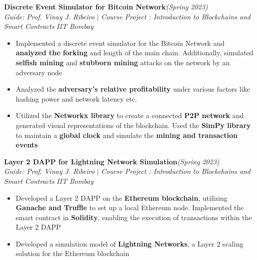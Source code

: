 \documentclass[a4paper,10pt]{article}
\begin{document}
\vspace{\baselineskip}
\vspace{-15pt}
\noindent\textbf{\large Discrete Event Simulator for Bitcoin Network}\hfill{\sl \small (Spring 2023)}\\
{\it Guide: Prof. Vinay J. Ribeiro} $|$ {\it Course Project : Introduction to Blockchains and Smart Contracts } \hfill{\it IIT Bombay}\\
\vspace{-15pt}
\begin{itemize}[itemsep = -0.65 mm, leftmargin=*]
    \item Implemented a discrete event simulator for the Bitcoin Network and \textbf{analyzed the forking} and length of the main chain. Additionally, simulated \textbf{selfish mining} and \textbf{stubborn mining} attacks on the network by an adversary node 
    \item Analyzed the \textbf{adversary's relative profitability} under various factors like hashing power and network latency etc.
    \item Utilized the \textbf{Networkx library} to create a connected \textbf{P2P network} and generated visual representations of the blockchain. Used the \textbf{SimPy library} to maintain a \textbf{global clock} and simulate the \textbf{mining and transaction events}
\end{itemize}
\vspace{\baselineskip}
\vspace{-15pt}
\noindent\textbf{\large Layer 2 DAPP for Lightning Network Simulation}\hfill{\sl \small (Spring 2023)}\\
{\it Guide: Prof. Vinay J. Ribeiro} $|$ {\it Course Project : Introduction to Blockchains and Smart Contracts } \hfill{\it IIT Bombay}\\
\vspace{-15pt}
\begin{itemize}[itemsep = -0.65 mm, leftmargin=*]
    \item Developed a Layer 2 DAPP on the \textbf{Ethereum blockchain}, utilizing \textbf{Ganache and Truffle} to set up a local Ethereum node. Implemented the smart contract in \textbf{Solidity}, enabling the execution of transactions within the Layer 2 DAPP
    \item Developed a simulation model of \textbf{Lightning Networks}, a Layer 2 scaling solution for the Ethereum blockchain
\end{itemize}
\end{document}
